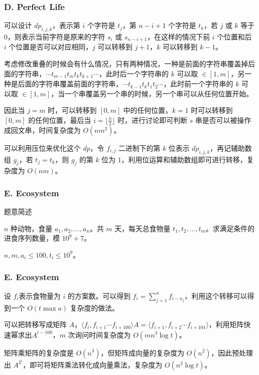 \documentclass[10pt,aspectratio=169,mathserif]{beamer}
\renewcommand*{\songti}{\CJKfamily{zhsong}}
\begin{document}
        \begin{frame}
        \frametitle{\songti \bfseries D. Perfect Life}

            可以设计 $dp_{i,j,k}$，表示第 $i$ 个字符是 $t_{j}$，第 $n-i+1$ 个字符是 $t_k$，若 $j$ 或 $k$ 等于 $0$，则表示当前字符是原来的字符 $s_i$ 或 $s_{n-i+1}$，在这样的情况下前 $i$ 个位置和后 $i$ 个位置是否可以对应相同，$j$ 可以转移到 $j+1$，$k$ 可以转移到 $k-1$。

            考虑修改重叠的时候会有什么情况，只有两种情况，一种是前面的字符串覆盖掉后面的字符串，$\cdots t_{m-1}t_mt_kt_{k+1}\cdots$，此时后一个字符串的 $k$ 可以取 $ \in[1,m]$，另一种是后面的字符串覆盖前面的字符串，$\cdots t_{k-1}t_kt_1t_{2}\cdots$，此时前一个字符串的 $k$ 可以取 $\in[1,m]$，当一个串覆盖另一个串的时候，另一个串可以从任何位置开始。

            因此当 $j=m$ 时，可以转移到 $[0,m]$ 中的任何位置，$k=1$ 时可以转移到 $[0,m]$ 的任何位置，最后当 $i=\lfloor\frac{n}{2}\rfloor$ 时，进行讨论即可判断 $s$ 串是否可以被操作成回文串，时间复杂度为 $O(nm^2)$。

            可以利用压位来优化这个 $dp$，令 $f_{i,j}$ 二进制下的第 $k$ 位表示 $dp_{i,j,k}$，再记辅助数组 $g_{j}$，若 $t_j=t_k$，则 $g_j$ 的第 $k$ 位为 $1$，利用位运算和辅助数组即可进行转移，复杂度为 $O(nm)$。

    \end{frame}

    \begin{frame}
        \frametitle{\songti \bfseries E. Ecosystem}
        \begin{block}{题意简述}
            
        $n$ 种动物，食量 $a_1, a_2, \dots, a_n$。共 $m$ 天，每天总食物量 $t_1, t_2, \dots, t_m$。求满足条件的进食序列数量，模 $10^9+7$。

        $n,m,a_i\le100,t_i\le 10^9$。
        \end{block}
    \end{frame}

\begin{frame}
        \frametitle{\songti \bfseries E. Ecosystem}

            设 $f_{i}$表示食物量为 $i$ 的方案数。可以得到 $f_{i}=\sum_{j=1}^nf_{i-a_j}$，利用这个转移可以得到一个 $O(t\max a)$ 复杂度的做法。
            
            可以把转移写成矩阵 $A$，$\langle f_i,f_{i+1}\cdots f_{i+100} \rangle A=\langle f_{i+1},f_{i+2}\cdots f_{i+101}\rangle$，利用矩阵快速幂求出$A^{t-100}$，$m$ 次询问时间复杂度为 $O(mn^3\log t)$。

            矩阵乘矩阵的复杂度是 $O(n^3)$，但矩阵成向量的复杂度为 $O(n^2)$，因此预处理出 $A^{2^i}$，即可将矩阵乘法转化成向量乘法，复杂度为 $O(n^3\log t)$。
    \end{frame}
\end{document}
